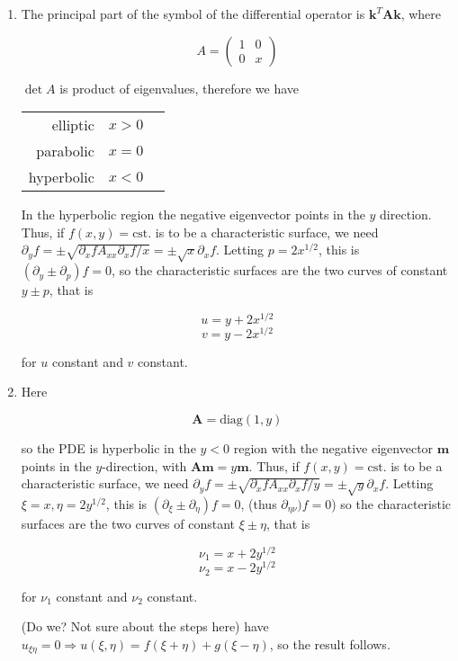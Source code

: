 \documentclass[a4paper]{article}
\begin{document}
\begin{enumerate}
	\item The principal part of the symbol of the differential operator is $ \mathbf{k}^{T} \mathbf{A} \mathbf{k} $, where 

	\[ A = \begin{pmatrix}
	1 & 0 \\
	0 & x
	\end{pmatrix} \]
	
	$ \det A  $ is product of eigenvalues, therefore we have 
	
	\begin{center}
		\begin{tabular}{rll}
			elliptic  & $ x > 0  $ \\
			parabolic  &  $ x = 0 $  \\
			hyperbolic &  $ x < 0$ 
		\end{tabular}
	\end{center}

	In the hyperbolic region the negative eigenvector points in the $ y $ direction. Thus, if $ f(x,y) = \text{cst.} $ is to be a characteristic surface, we need $ \partial_{y} f = \pm \sqrt{ \partial_{x} f  A_{xx} \partial_{x} f / x } = \pm \sqrt{x} \partial_{x} f  $. Letting $ p = 2 x^{1/2} $, this is $ (\partial_{y} \pm \partial_{p})f = 0 $, so the characteristic surfaces are the two curves of constant $ y \pm p $, that is
	
	\[ u = y + 2x^{1/2} \]
	\[ v = y - 2x^{1/2} \]
	
	for $ u $ constant and $ v $ constant.

	\item Here
	
	\[ \mathbf{A} = \text{diag}(1,y) \]
	
	so the PDE is hyperbolic in the $ y < 0 $ region with the negative eigenvector $ \mathbf{m} $ points in the $ y $-direction, with $ \mathbf{A} \mathbf{m} = y \mathbf{m} $. Thus, if $ f(x,y) = \text{cst.} $ is to be a characteristic surface, we need $ \partial_{y} f = \pm \sqrt{ \partial_{x} f  A_{xx} \partial_{x} f / y } = \pm \sqrt{y} \partial_{x} f  $. Letting $ \xi = x, \eta  = 2 y^{1/2} $, this is $ (\partial_{\xi} \pm \partial_{\eta})f = 0 $, (thus $ \partial_{\eta \nu})f = 0 $)  so the characteristic surfaces are the two curves of constant $ \xi \pm \eta $, that is
	
		
	\[ \nu_{1} = x + 2y^{1/2} \]
	\[ \nu_{2} = x - 2y^{1/2} \]
	
	for $ \nu_{1} $ constant and $ \nu_{2} $ constant.
	
	(Do we? Not sure about the steps here) have $ u_{\xi\eta} = 0 \Rightarrow u(\xi,\eta) = f(\xi + \eta) + g(\xi - \eta) $, so the result follows.
 	
	
	 
	
\end{enumerate}
\end{document}
